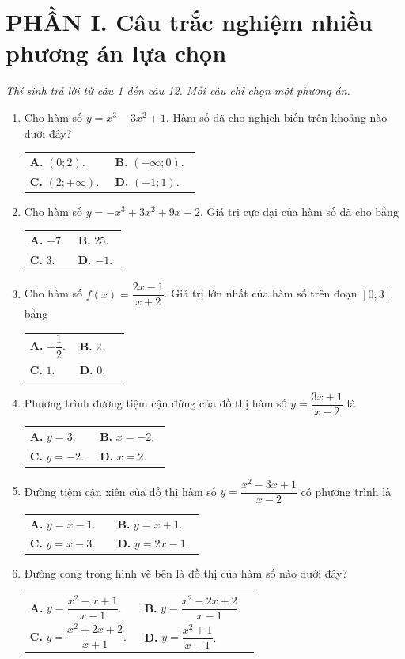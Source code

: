\documentclass[12pt,a4paper]{article}
\makeatletter
\newcommand{\bonpa}[4]{\par\nobreak\smallskip\nobreak\noindent
\begin{tabular}{@{}p{0.47\linewidth}p{0.47\linewidth}@{}}
\textbf{A.} #1 & \textbf{B.} #2\\[8pt]
\textbf{C.} #3 & \textbf{D.} #4\end{tabular}}
\makeatother
\begin{document}
\section*{\large PHẦN I. Câu trắc nghiệm nhiều phương án lựa chọn}
\textit{Thí sinh trả lời từ câu 1 đến câu 12. Mỗi câu chỉ chọn một phương án.}
\begin{enumerate}
\item Cho hàm số $y=x^3-3x^2+1$. Hàm số đã cho nghịch biến trên khoảng nào dưới đây?
\bonpa{$(0;2)$.}{$(-\infty;0)$.}{$(2;+\infty)$.}{$(-1;1)$.}

\item Cho hàm số $y=-x^3+3x^2+9x-2$. Giá trị cực đại của hàm số đã cho bằng
\bonpa{$-7$.}{$25$.}{$3$.}{$-1$.}

\item Cho hàm số $f(x)=\dfrac{2x-1}{x+2}$. Giá trị lớn nhất của hàm số trên đoạn $[0;3]$ bằng
\bonpa{$-\dfrac{1}{2}$.}{$2$.}{$1$.}{$0$.}

\item Phương trình đường tiệm cận đứng của đồ thị hàm số $y=\dfrac{3x+1}{x-2}$ là
\bonpa{$y=3$.}{$x=-2$.}{$y=-2$.}{$x=2$.}

\item Đường tiệm cận xiên của đồ thị hàm số $y=\dfrac{x^2-3x+1}{x-2}$ có phương trình là
\bonpa{$y=x-1$.}{$y=x+1$.}{$y=x-3$.}{$y=2x-1$.}

\item Đường cong trong hình vẽ bên là đồ thị của hàm số nào dưới đây?
\par\nobreak\smallskip
\begin{minipage}[c]{0.62\linewidth}
\bonpa{$y=\dfrac{x^2-x+1}{x-1}$.}{$y=\dfrac{x^2-2x+2}{x-1}$.}{$y=\dfrac{x^2+2x+2}{x+1}$.}{$y=\dfrac{x^2+1}{x-1}$.}
\end{minipage}\hfill
\begin{minipage}[c]{0.36\linewidth}\centering
{}
\end{minipage}
\end{enumerate}
\end{document}
